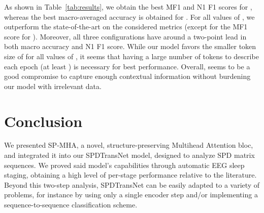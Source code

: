 \documentclass{article}
\begin{document}
As shown in Table~\ref{tab:results}, we obtain the best MF1 and N1 F1 scores for , whereas the best macro-averaged accuracy is obtained for .
For all values of , we outperform the state-of-the-art on the considered metrics (except for the MF1 score for ). Moreover, all three configurations have around a two-point lead in both macro accuracy and N1 F1 score.
While our model favors the smaller token size of  for all values of , it seems that having a large number of tokens to describe each epoch (at least ) is necessary for best performance. 
Overall,  seems to be a good compromise to capture enough contextual information without burdening our model with irrelevant data.

\section{Conclusion}
\label{sec:conclusion}

We presented SP-MHA, a novel, structure-preserving Multihead Attention bloc, and integrated it into our SPDTransNet model, designed to analyze SPD matrix sequences. We proved said model's capabilities through automatic EEG sleep staging, obtaining a high level of per-stage performance relative to the literature.
Beyond this two-step analysis, SPDTransNet can be easily adapted to a variety of problems, for instance by using only a single encoder step and/or implementing a sequence-to-sequence classification scheme.

\newpage


\end{document}

